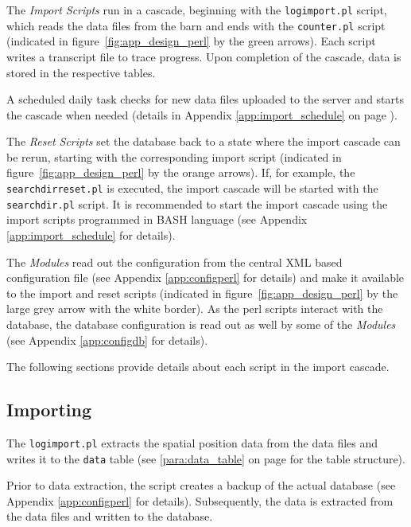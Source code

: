 The \textit{Import Scripts} run in a cascade, beginning with the \lstinline|logimport.pl| script, which reads the data files from the barn and ends with the \lstinline|counter.pl| script (indicated in figure~\ref{fig:app_design_perl} by the green arrows). Each script writes a transcript file to trace progress. Upon completion of the cascade, data is stored in the respective tables.

A scheduled daily task checks for new data files uploaded to the server and starts the cascade when needed (details in Appendix \ref{app:import_schedule} on page \pageref{app:import_schedule}). 

The \textit{Reset Scripts} set the database back to a state where the import cascade can be rerun, starting with the corresponding import script (indicated in figure~\ref{fig:app_design_perl} by the orange arrows). If, for example, the \lstinline|searchdirreset.pl| is executed, the import cascade will be started with the \lstinline|searchdir.pl| script. It is recommended to start the import cascade using the import scripts programmed in BASH language (see Appendix \ref{app:import_schedule} for details).

The \textit{Modules} read out the configuration from the central \ac{XML} based configuration file (see Appendix \ref{app:configperl} for details) and make it available to the import and reset scripts (indicated in figure~\ref{fig:app_design_perl} by the large grey arrow with the white border). As the perl scripts interact with the database, the database configuration is read out as well by some of the \textit{Modules} (see Appendix \ref{app:configdb} for details). 

The following sections provide details about each script in the import cascade.

\subsection{Importing}
\label{subsec:importing}

The \lstinline|logimport.pl| extracts the spatial position data from the data files and writes it to the \lstinline|data| table (see \ref{para:data_table} on page \pageref{para:data_table} for the table structure).

Prior to data extraction, the  script creates a backup of the actual database (see Appendix \ref{app:configperl} for details). Subsequently, the data is extracted from the data files and written to the database. 


